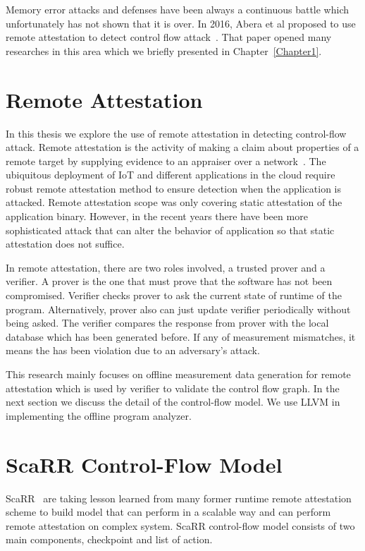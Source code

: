 Memory error attacks and defenses have been always a continuous battle which
unfortunately has not shown that it is over. In 2016, Abera et al proposed to
use remote attestation to detect control flow
attack~\cite{aberaCFLATControlFlowAttestation2016}. That paper opened many
researches in this area which we briefly presented in Chapter~\ref{Chapter1}.
 
\section{Remote Attestation}
\label{sec:remote-attestation}

In this thesis we explore the use of remote attestation in detecting
control-flow attack. Remote attestation is the activity of making a claim about
properties of a remote target by supplying evidence to an appraiser over a
network~\cite{cokerPrinciplesRemoteAttestation2011a}. The ubiquitous deployment
of IoT and different applications in the cloud require robust remote attestation
method to ensure detection when the application is attacked.  Remote attestation
scope was only covering static attestation of the application binary. However,
in the recent years there have been more sophisticated attack that can alter the
behavior of application so that static attestation does not suffice. 

In remote attestation, there are two roles involved, a trusted prover and a
verifier. A prover is the one that must prove that the software has not been
compromised. Verifier checks prover to ask the current state of runtime of the
program. Alternatively, prover also can just update verifier periodically
without being asked. The verifier compares the response from prover with the
local database which has been generated before. If any of measurement
mismatches, it means the has been violation due to an adversary's attack.

This research mainly focuses on offline measurement data generation for remote
attestation which is used by verifier to validate the control flow graph. In the
next section we discuss the detail of the control-flow model. We use LLVM in
implementing the offline program analyzer.

\section{ScaRR Control-Flow Model} 
\label{sec:scarr-model}

ScaRR~\cite{toffaliniScaRRScalableRuntime2019} are taking lesson learned from
many former runtime remote attestation scheme to build model that can perform in
a scalable way and can perform remote attestation on complex system. ScaRR
control-flow model consists of two main components, checkpoint and list of
action. 

